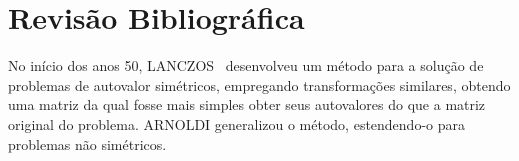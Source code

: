 \chapter{Revisão Bibliográfica}

No início dos anos 50, LANCZOS~\cite{Lan50a} desenvolveu um método para a
solução de problemas de autovalor simétricos, empregando transformações
similares, obtendo uma matriz da qual fosse mais simples obter seus autovalores
do que a matriz original do problema. ARNOLDI \cite{Arn51a} generalizou o
método, estendendo-o para problemas não simétricos.


